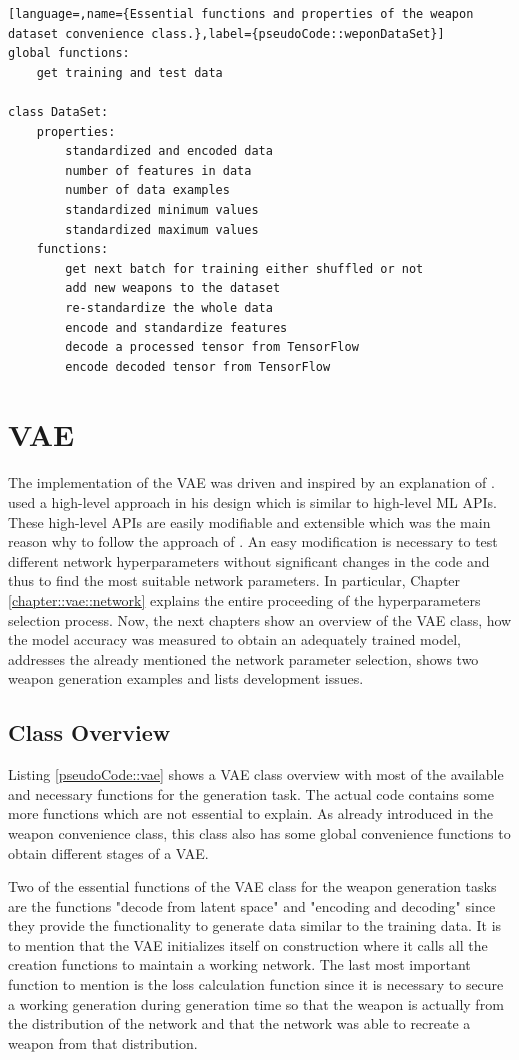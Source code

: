 \documentclass[MGS,Master,english]{twbook}%
\begin{document}
\begin{lstlisting}[language=,name={Essential functions and properties of the weapon dataset convenience class.},label={pseudoCode::weponDataSet}]
global functions:
	get training and test data
	
class DataSet:
	properties:
		standardized and encoded data
		number of features in data
		number of data examples
		standardized minimum values
		standardized maximum values 
	functions:
		get next batch for training either shuffled or not
		add new weapons to the dataset
		re-standardize the whole data
		encode and standardize features
		decode a processed tensor from TensorFlow
		encode decoded tensor from TensorFlow
\end{lstlisting}

\section{\acl{VAE}}
The implementation of the VAE was driven and inspired by an explanation of \citep{tutorial::vaeTF}.  used a high-level approach in his design which is similar to high-level ML APIs. These high-level APIs are easily modifiable and extensible which was the main reason why to follow the approach of . An easy modification is necessary to test different network hyperparameters without significant changes in the code and thus to find the most suitable network parameters. In particular, Chapter \ref{chapter::vae::network} explains the entire proceeding of the hyperparameters selection process. Now, the next chapters show an overview of the VAE class, how the model accuracy was measured to obtain an adequately trained model, addresses the already mentioned the network parameter selection, shows two weapon generation examples and lists development issues.

\subsection{Class Overview}
Listing \ref{pseudoCode::vae} shows a VAE class overview with most of the available and necessary functions for the generation task. The actual code contains some more functions which are not essential to explain. As already introduced in the weapon convenience class, this class also has some global convenience functions to obtain different stages of a VAE. 

Two of the essential functions of the VAE class for the weapon generation tasks are the functions "decode from latent space" and "encoding and decoding" since they provide the functionality to generate data similar to the training data. It is to mention that the VAE initializes itself on construction where it calls all the creation functions to maintain a working network. The last most important function to mention is the loss calculation function since it is necessary to secure a working generation during generation time so that the weapon is actually from the distribution of the network and that the network was able to recreate a weapon from that distribution.
\end{document}
